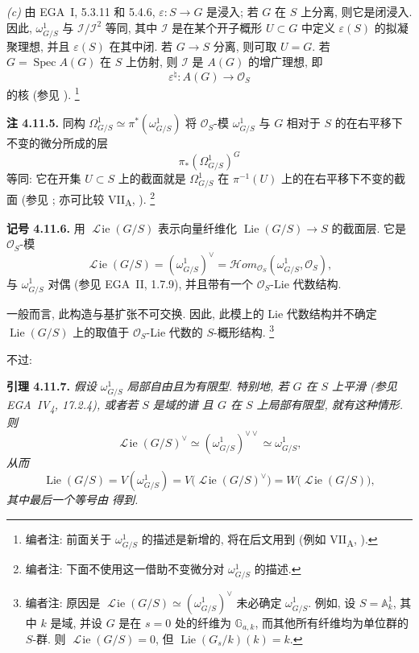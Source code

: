 \textit{(c)} 由 EGA~I, 5.3.11 和 5.4.6,
\(\varepsilon:S\to G\) 是浸入; 若 \(G\) 在 \(S\) 上分离,
则它是闭浸入. 因此, \(\omega^1_{G/S}\) 与
\(\mathcal I/\mathcal I^2\) 等同, 其中 \(\mathcal I\)
是在某个开子概形 \(U\subset G\) 中定义 \(\varepsilon(S)\) 的拟凝聚理想,
并且 \(\varepsilon(S)\) 在其中闭.
若 \(G\to S\) 分离, 则可取 \(U=G\).
若 \(G=\operatorname{Spec}A(G)\) 在 \(S\) 上仿射,
则 \(\mathcal I\) 是 \(A(G)\) 的增广理想, 即
\[
 \varepsilon^\natural:A(G)\longrightarrow\mathcal O_S
\]
的核 (参见 ).
\footnote{编者注: 前面关于 \(\omega^1_{G/S}\) 的描述是新增的,
将在后文用到 (例如 VII\textsubscript{A}, ).}

\medskip
\noindent{}\textbf{注 4.11.5.}
同构
\(\Omega^1_{G/S}\simeq\pi^*(\omega^1_{G/S})\) 将
\(\mathcal O_S\)-模 \(\omega^1_{G/S}\) 与 \(G\) 相对于 \(S\)
的在右平移下不变的微分所成的层
\[
 \pi_*(\Omega^1_{G/S})^G
\]
等同: 它在开集 \(U\subset S\) 上的截面就是
\(\Omega^1_{G/S}\) 在 \(\pi^{-1}(U)\) 上的在右平移下不变的截面
(参见 ; 亦可比较
VII\textsubscript{A}, ).
\footnote{编者注: 下面不使用这一借助不变微分对
\(\omega^1_{G/S}\) 的描述.}

\medskip
\noindent{}\textbf{记号 4.11.6.}
用 \(\mathop{\mathscr L\!ie}(G/S)\) 表示向量纤维化
\(\operatorname{Lie}(G/S)\to S\) 的截面层. 它是
\(\mathcal O_S\)-模
\[
 \mathop{\mathscr L\!ie}(G/S)
 =(\omega^1_{G/S})^\vee
 =\mathcal Hom_{\mathcal O_S}(\omega^1_{G/S},\mathcal O_S),
\]
与 \(\omega^1_{G/S}\) 对偶 (参见 EGA~II, 1.7.9),
并且带有一个 \(\mathcal O_S\)-Lie 代数结构.

一般而言, 此构造与基扩张不可交换. 因此, 此模上的 Lie 代数结构并不确定
\(\operatorname{Lie}(G/S)\) 上的取值于 \(\mathcal O_S\)-Lie 代数的
\(S\)-概形结构.
\footnote{编者注: 原因是
\(\mathop{\mathscr L\!ie}(G/S)\simeq(\omega^1_{G/S})^\vee\)
未必确定 \(\omega^1_{G/S}\). 例如, 设
\(S=\mathbb A^1_k\), 其中 \(k\) 是域,
并设 \(G\) 是在 \(s=0\) 处的纤维为 \(\mathbb G_{a,k}\),
而其他所有纤维均为单位群的 \(S\)-群. 则
\(\mathop{\mathscr L\!ie}(G/S)=0\), 但
\(\operatorname{Lie}(G_s/k)(k)=k\).}

不过:

\medskip
\noindent{}\textbf{引理 4.11.7.}
\textit{假设 \(\omega^1_{G/S}\) 局部自由且为有限型.
特别地, 若 \(G\) 在 \(S\) 上平滑
(参见 EGA~IV\textsubscript{4}, 17.2.4), 或者若 \(S\) 是域的谱
且 \(G\) 在 \(S\) 上局部有限型, 就有这种情形. 则}
\[
 \mathop{\mathscr L\!ie}(G/S)^\vee
 \simeq(\omega^1_{G/S})^{\vee\vee}
 \simeq\omega^1_{G/S},
\]
\textit{从而}
\[
 \operatorname{Lie}(G/S)
 =V(\omega^1_{G/S})
 =V\bigl(\mathop{\mathscr L\!ie}(G/S)^\vee\bigr)
 =W\bigl(\mathop{\mathscr L\!ie}(G/S)\bigr),
\]
\textit{其中最后一个等号由  得到.}


